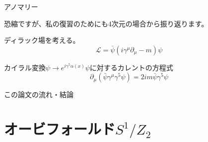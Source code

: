 \documentclass[
  unicode,a4paper,10pt,
  xcolor = {dvipsnames,svgnames},
  hyperref ={colorlinks=true,citecolor=Navy,linkcolor=NavyBlue,urlcolor=purple},
  ja=standard,lualatex
]{beamer}
\begin{document}
\begin{frame}{アノマリー}

  恐縮ですが、私の復習のためにも4次元の場合から振り返ります。

  \vspace*{10pt}

  ディラック場を考える。
  \begin{equation}
    \mathcal{L}
    =
    \bar{\psi}(i\gamma^{\mu}\partial_{\mu}-m)\psi
    \nonumber
  \end{equation}  

  \vspace*{10pt}

  カイラル変換$\psi\rightarrow e^{i\gamma^{5}\alpha(x)}\psi$に対するカレントの方程式
  \begin{equation}
    \partial_{\mu}
    (\bar{\psi}\gamma^{\mu}\gamma^{5}\psi)
    =
    2im\bar{\psi}\gamma^{5}\psi
  \end{equation}

\end{frame}



\begin{frame}


  

\end{frame}



\begin{frame}{この論文の流れ・結論}

  

  

\end{frame}



\section{オービフォールド\texorpdfstring{$S^{1}/Z_{2}$}{S1/Z2}}

\begin{frame}
  \huge \secname
\end{frame}


\begin{frame}

  

\end{frame}




\setcounter{Appendix}{\value{framenumber}}
\setcounter{section}{0}
\renewcommand{\thesubsection}{\Alph{subsection}}
\makeatletter
\renewcommand{\theequation}{\thesubsection.\arabic{equation}}
\end{document}
